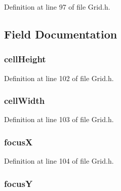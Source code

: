 Definition at line 97 of file Grid.\+h.



\subsection{Field Documentation}
\hypertarget{struct_g_r_i_d_a7791a8408bdda25041026883e493c8e5}{}
\subsubsection[{cell\+Height}]{ cell\+Height}\label{struct_g_r_i_d_a7791a8408bdda25041026883e493c8e5}


Definition at line 102 of file Grid.\+h.

\hypertarget{struct_g_r_i_d_a428189ddbd271ed447efb425b7cb29e9}{}
\subsubsection[{cell\+Width}]{ cell\+Width}\label{struct_g_r_i_d_a428189ddbd271ed447efb425b7cb29e9}


Definition at line 103 of file Grid.\+h.

\hypertarget{struct_g_r_i_d_a816699d44abcc9fe21d9427e71128f86}{}
\subsubsection[{focus\+X}]{ focus\+X}\label{struct_g_r_i_d_a816699d44abcc9fe21d9427e71128f86}


Definition at line 104 of file Grid.\+h.

\hypertarget{struct_g_r_i_d_a1afb951e441f599c966d78fbcd500ebe}{}
\subsubsection[{focus\+Y}]{ focus\+Y}\label{struct_g_r_i_d_a1afb951e441f599c966d78fbcd500ebe}


